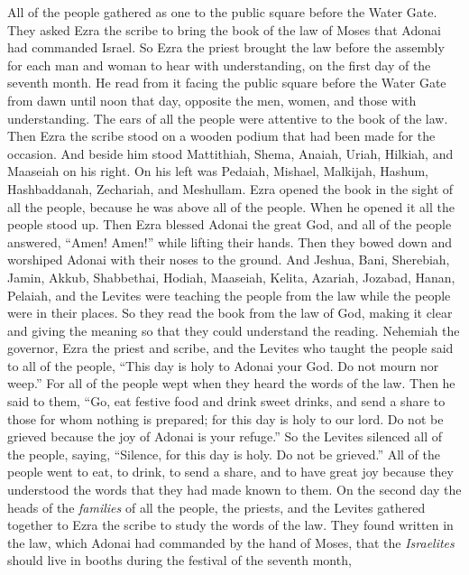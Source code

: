 \begin{biblechapter} %
 All of the people gathered as one to the public square before the Water Gate. They asked Ezra the scribe to bring the book of the law of Moses that Adonai had commanded Israel.
\verse So Ezra the priest brought the law before the assembly for each man and woman to hear with understanding, on the first day of the seventh month.
\verse He read from it facing the public square before the Water Gate from dawn until noon that day, opposite the men, women, and those with understanding. The ears of all the people were attentive to the book of the law.
\verse Then Ezra the scribe stood on a wooden podium that had been made for the occasion. And beside him stood Mattithiah, Shema, Anaiah, Uriah, Hilkiah, and Maaseiah on his right. On his left was Pedaiah, Mishael, Malkijah, Hashum, Hashbaddanah, Zechariah, and Meshullam.
\verse Ezra opened the book in the sight of all the people, because he was above all of the people. When he opened it all the people stood up.
\verse Then Ezra blessed Adonai the great God, and all of the people answered, “Amen! Amen!” while lifting their hands. Then they bowed down and worshiped Adonai with their noses to the ground.
\verse And Jeshua, Bani, Sherebiah, Jamin, Akkub, Shabbethai, Hodiah, Maaseiah, Kelita, Azariah, Jozabad, Hanan, Pelaiah, and the Levites were teaching the people from the law while the people were in their places.
\verse So they read the book from the law of God, making it clear and giving the meaning so that they could understand the reading.
\verse Nehemiah the governor, Ezra the priest and scribe, and the Levites who taught the people said to all of the people, “This day is holy to Adonai your God. Do not mourn nor weep.” For all of the people wept when they heard the words of the law.
\verse Then he said to them, “Go, eat festive food and drink sweet drinks, and send a share to those for whom nothing is prepared; for this day is holy to our lord. Do not be grieved because the joy of Adonai is your refuge.”
\verse So the Levites silenced all of the people, saying, “Silence, for this day is holy. Do not be grieved.”
\verse All of the people went to eat, to drink, to send a share, and to have great joy because they understood the words that they had made known to them.
 On the second day the heads of the \textit{families} of all the people, the priests, and the Levites gathered together to Ezra the scribe to study the words of the law.
\verse They found written in the law, which Adonai had commanded by the hand of Moses, that the \textit{Israelites} should live in booths during the festival of the seventh month,

\end{biblechapter}
